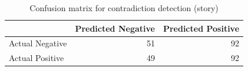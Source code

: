 \begin{table}
\caption{Confusion matrix for contradiction detection (story)}
\label{tab:confusion_matrix}
\begin{tabular}{lrr}
\toprule
 & Predicted Negative & Predicted Positive \\
\midrule
Actual Negative & 51 & 92 \\
Actual Positive & 49 & 92 \\
\bottomrule
\end{tabular}
\end{table}

